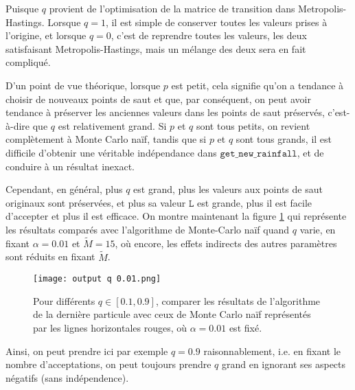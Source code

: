 \documentclass{article}
\begin{document}
Puisque $q$ provient de l'optimisation de la matrice de transition dans Metropolis-Hastings. Lorsque $q = 1$, il est simple de conserver toutes les valeurs prises à l'origine, et lorsque $q = 0$, c'est de reprendre toutes les valeurs, les deux satisfaisant Metropolis-Hastings, mais un mélange des deux sera en fait compliqué. 

 D'un point de vue théorique, lorsque $p$ est petit, cela signifie qu'on a tendance à choisir de nouveaux points de saut et que, par conséquent, on peut avoir tendance à préserver les anciennes valeurs dans les points de saut préservés, c'est-à-dire que $q$ est relativement grand. Si $p$ et $q$ sont tous petits, on revient complètement à Monte Carlo naïf, tandis que si $p$ et $q$ sont tous grands, il est difficile d'obtenir une véritable indépendance dans $\texttt{get\_new\_rainfall}$, et de conduire à un résultat inexact.

Cependant, en général, plus $q$ est grand, plus les valeurs aux points de saut originaux sont préservées, et plus sa valeur $\texttt{L}$ est grande, plus il est facile d'accepter et plus il est efficace. On montre maintenant la figure \ref{0.6} qui représente les résultats comparés avec l'algorithme de Monte-Carlo naïf quand $q$ varie, en fixant $\alpha=0.01$ et $\tilde M=15$, où encore, les effets indirects des autres paramètres sont réduits en fixant $\tilde M$.

\begin{figure}[H]
    \centering
    \texttt{[image: output q 0.01.png]}
    \caption{Pour différents $q\in[0.1,0.9]$, comparer les résultats de l'algorithme de la dernière particule avec ceux de Monte Carlo naïf représentés par les lignes horizontales rouges, où $\alpha=0.01$ est fixé.}
    \label{0.6}
\end{figure}

Ainsi, on peut prendre ici par exemple $q=0.9$ raisonnablement, i.e. en fixant le nombre d'acceptations, on peut toujours prendre $q$ grand en ignorant ses aspects négatifs (sans indépendence).
\end{document}
